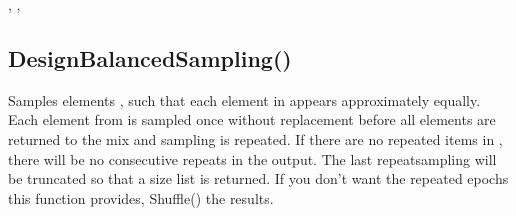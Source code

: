 \documentclass[letterpaper,10pt,english]{sphinxmanual}
\begin{document}
\begin{sphinxVerbatim}[commandchars=\\\{\}]
\PYG{p}{[}\PYG{p}{]}

\PYG{p}{[}\PYG{p}{]}
\end{sphinxVerbatim}

\sphinxAtStartPar
{}

\sphinxAtStartPar
{}, , 

\ignorespaces 

\subsection{DesignBalancedSampling()}
\label{\detokenize{reference/design:designbalancedsampling}}\label{\detokenize{reference/design:index-1}}
\sphinxAtStartPar
{}

\sphinxAtStartPar
Samples elements , such that each element in             appears approximately equally.  Each element from                is sampled once without replacement before                 all elements are returned to the mix and sampling is repeated.                  If there are no repeated items in , there will be no                  consecutive repeats in the output.  The last repeat\sphinxhyphen{}sampling            will be truncated so that a \sphinxhyphen{}size list is returned.                 If you don’t want the repeated epochs this function provides,           Shuffle() the results.
\end{document}
